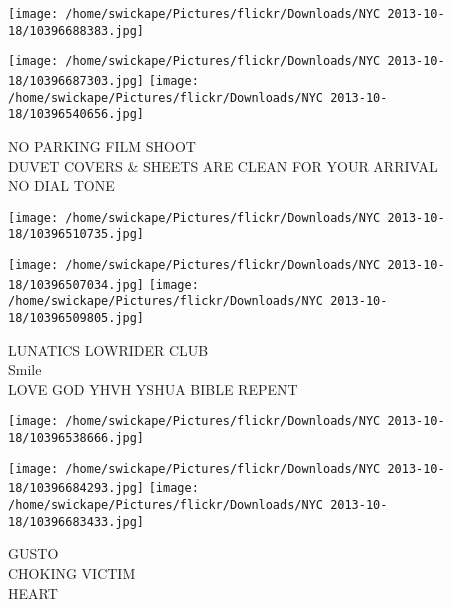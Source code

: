 \documentclass[10pt,letterpaper]{article}
\begin{document}
\texttt{[image: /home/swickape/Pictures/flickr/Downloads/NYC 2013-10-18/10396688383.jpg]}

\vspace{0.25in}
\texttt{[image: /home/swickape/Pictures/flickr/Downloads/NYC 2013-10-18/10396687303.jpg]}
\texttt{[image: /home/swickape/Pictures/flickr/Downloads/NYC 2013-10-18/10396540656.jpg]}

NO PARKING FILM SHOOT\\
DUVET COVERS \& SHEETS ARE CLEAN FOR YOUR ARRIVAL\\
NO DIAL TONE\\
\pagebreak

\texttt{[image: /home/swickape/Pictures/flickr/Downloads/NYC 2013-10-18/10396510735.jpg]}

\vspace{0.25in}
\texttt{[image: /home/swickape/Pictures/flickr/Downloads/NYC 2013-10-18/10396507034.jpg]}
\texttt{[image: /home/swickape/Pictures/flickr/Downloads/NYC 2013-10-18/10396509805.jpg]}

LUNATICS LOWRIDER CLUB\\
Smile\\
LOVE GOD YHVH YSHUA BIBLE REPENT\\
\pagebreak

\texttt{[image: /home/swickape/Pictures/flickr/Downloads/NYC 2013-10-18/10396538666.jpg]}

\vspace{0.25in}
\texttt{[image: /home/swickape/Pictures/flickr/Downloads/NYC 2013-10-18/10396684293.jpg]}
\texttt{[image: /home/swickape/Pictures/flickr/Downloads/NYC 2013-10-18/10396683433.jpg]}

GUSTO\\
CHOKING VICTIM\\
HEART\\
\pagebreak
\end{document}
